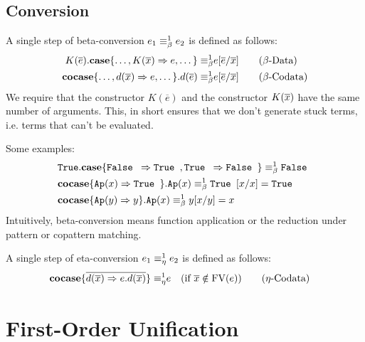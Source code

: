 \documentclass[twoside,12pt,a4paper]{article}
\begin{document}
\subsection{Conversion}


\begin{definition}
    A single step of beta-conversion $e_1 \equiv_{\beta}^1 e_2$ is defined as follows:
    \begin{align*}
        K(\overline{e}).\textbf{case}\{\dots,K(\overline{x})\Rightarrow e,\dots\} 
        \equiv_{\beta}^1 & e[\overline{e}/\overline{x}] \tag{$\beta$-Data}\\
        \textbf{cocase}\{\dots,d(\overline{x}) \Rightarrow e, \dots\}.d(\overline{e})
        \equiv_{\beta}^1 & e[\overline{e}/\overline{x}]  \tag{$\beta$-Codata}
    \end{align*}
    We require that the constructor $K(\overline{e})$ and the constructor $K(\overline{x})$ have the same number of arguments.
    This, in short ensures that we don't generate stuck terms, i.e. terms that can't be evaluated. %
\end{definition}
Some examples:
\begin{align*}
    &\texttt{True}.\textbf{case}\{\texttt{False }\Rightarrow \texttt{True }, \texttt{True } \Rightarrow \texttt{False }\}\equiv_{\beta}^1\texttt{False }\\
    &\textbf{cocase}\{\texttt{Ap}(x)\Rightarrow \texttt{True }\}.\texttt{Ap}(x)\equiv_{\beta}^1 \texttt{True }[x/x] = \texttt{True } \\
    &\textbf{cocase}\{\texttt{Ap}(y)\Rightarrow y\}.\texttt{Ap}(x) \equiv_{\beta}^1 y[x/y]= x
\end{align*}
Intuitively, beta-conversion means function application or the reduction under pattern or copattern matching. %

\begin{definition}
    A single step of eta-conversion $e_1 \equiv_{\eta}^1 e_2$ is defined as follows:
    \begin{align*}
        \textbf{cocase}\{\overline{d(\overline{x})\Rightarrow e.d(\overline{x})}\}
        \equiv_{\eta}^1 & e \quad (\text{if } \overline{x}\notin \text{FV}(e)) \tag{$\eta$-Codata}
    \end{align*}
\end{definition}

\section{First-Order Unification}
\end{document}

